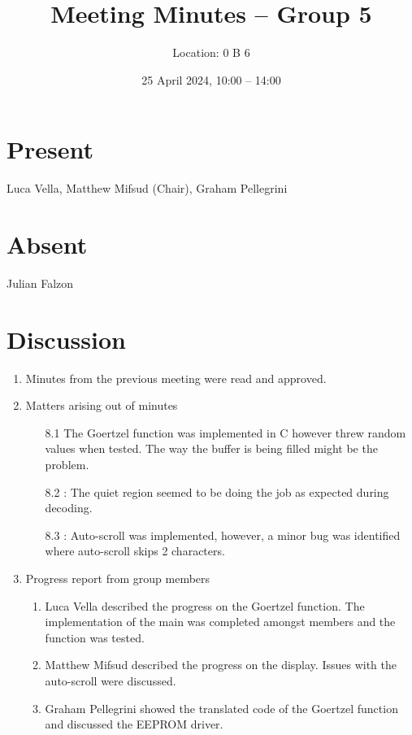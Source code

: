 \documentclass{cce2014-meetings}
\title{Meeting Minutes -- Group 5}
\author{Location: 0 B 6}
\date{25 April 2024, 10:00 -- 14:00}
\begin{document}
\maketitle

\section*{Present}
Luca Vella,
Matthew Mifsud (Chair),
Graham Pellegrini

\section*{Absent}
Julian Falzon

\section*{Discussion}

\begin{enumerate}


   \item Minutes from the previous meeting were read and approved.

   \item Matters arising out of minutes
         \begin{enumerate}
            \item [8.1] The Goertzel function was implemented in C however threw random values when tested. The way the buffer is being filled might be the problem.
            \item [8.2]: The quiet region seemed to be doing the job as expected during decoding.
            \item [8.3]: Auto-scroll was implemented, however, a minor bug was identified where auto-scroll skips 2 characters.
         \end{enumerate}

   \item Progress report from group members
         \begin{enumerate}
            \item Luca Vella described the progress on the Goertzel function. The implementation of the main was completed amongst members and the function was tested.
            \item Matthew Mifsud described the progress on the display. Issues with the auto-scroll were discussed.
            \item Graham Pellegrini showed the translated code of the Goertzel function and discussed the EEPROM driver.
         \end{enumerate}
\end{enumerate}
\end{document}

